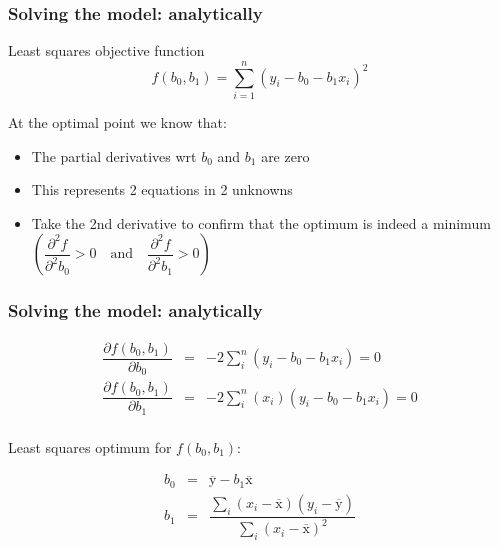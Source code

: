 \begin{frame}\frametitle{Solving the model: analytically}
	\begin{block}{Least squares objective function} 
		$$ f(b_0, b_1) = \sum_{i=1}^{n}{\left(y_i - b_0 - b_1 x_i\right)^2} $$ 
	\end{block}
	
	At the optimal point we know that: 
	\begin{itemize}
		\item	The partial derivatives wrt $b_0$ and $b_1$ are zero 
		\item	This represents 2 equations in 2 unknowns 
		\item	Take the 2nd derivative to confirm that the optimum is indeed a minimum $\left(\dfrac{
		\partial^2 f}{ 
		\partial^2 b_0} > 0 \quad \text{and} \quad \dfrac{
		\partial^2 f}{ 
		\partial^2 b_1} > 0\right)$ 
	\end{itemize}
\end{frame}

\begin{frame}\frametitle{Solving the model: analytically}
	
	$$ 
	\begin{array}{rcl}
		\dfrac{
		\partial f(b_0, b_1)}{
		\partial{b_0}} &=& -2 \sum_i^{n}{(y_i - b_0 - b_1 x_i)} = 0 \\
		\dfrac{
		\partial f(b_0, b_1)}{
		\partial{b_1}} &=& -2 \sum_i^{n}{(x_i)(y_i - b_0 - b_1 x_i)} = 0 \\
	\end{array}
	$$
	
	Least squares optimum for $f(b_0, b_1)$:
	
	$$ 
	\begin{array}{rcl}
		b_0 &=& \overline{\mathrm{y}} - b_1\overline{\mathrm{x}} \\
		b_1 &=& \dfrac{ \sum_i{\left(x_i - \overline{\mathrm{x}}\right)\left(y_i - \overline{\mathrm{y}}\right) } }{ \sum_i{\left( x_i - \overline{\mathrm{x}}\right)^2} } 
	\end{array}
	$$
\end{frame}

